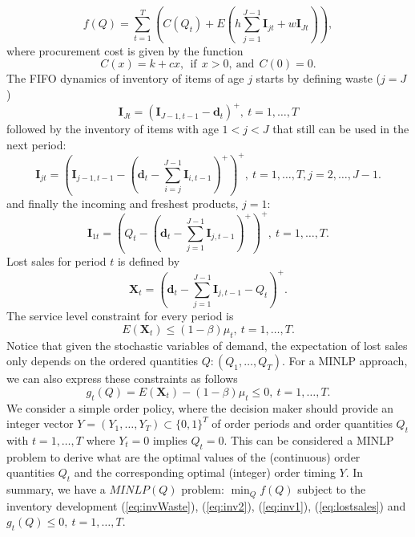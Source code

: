 \begin{equation}
\label{eq:obj}
f(Q)=\sum_{t=1}^T \left(C(Q_t) + E\left(h\sum_{j=1}^{J-1} \boldsymbol{I}_{jt}  +w\boldsymbol{I}_{Jt}\right)\right),
\end{equation}
where procurement cost is given by the function
\begin{equation}
\label{eq:proc}
C(x) = k+cx, \ \ \text{if} \ \ x>0,\ \text{and}\ \ C(0)=0 .
\end{equation}
%
The FIFO dynamics of inventory of items of  age $j$ starts by defining waste ($j=J$)
\begin{equation}
\label{eq:invWaste}
\boldsymbol{I}_{Jt}=(\boldsymbol{I}_{J-1,t-1} - \boldsymbol{d}_t)^+, \ t=1,\ldots,T
\end{equation}
followed by the inventory of items with age $1<j<J$ that still can be used in the next period:
\begin{equation}
\label{eq:inv2}
\boldsymbol{I}_{jt}= \left(\boldsymbol{I}_{j-1,t-1} - (\boldsymbol{d}_t-\sum_{i=j}^{J-1}\boldsymbol{I}_{i,t-1})^+\right)^+, \ t=1,\ldots,T, j=2,\ldots,J-1 .
\end{equation}
%
and finally the incoming and freshest products, $j=1$:
%
\begin{equation}
\label{eq:inv1}
\boldsymbol{I}_{1t}= \left(Q_t - (\boldsymbol{d}_t-\sum_{j=1}^{J-1}\boldsymbol{I}_{j,t-1})^+\right)^+, \ t=1,\ldots,T.
\end{equation}
%
Lost sales for period $t$ is defined by
%
\begin{equation}
\label{eq:lostsales}
\boldsymbol{X}_t=\left(\boldsymbol{d}_t-\sum_{j=1}^{J-1}\boldsymbol{I}_{j,t-1}-Q_t\right)^+.
\end{equation}
%
The service level constraint for every period is
\begin{equation}
\label{eq:chance}
E \left(\boldsymbol{X}_t\right) \le (1-\beta) \mu_t, \ t=1,\ldots,T.
\end{equation}
%
Notice that given the stochastic variables of demand, the expectation of lost sales only depends on the ordered quantities $Q: (Q_1,\ldots, Q_T)$. For a MINLP approach, we can also express these constraints as follows
%
\begin{equation}
\label{eq:defg}
g_t(Q)=E \left(\boldsymbol{X}_t\right) - (1-\beta)\mu_t\le 0,\ t=1,\ldots,T.
\end{equation}
%
We consider a simple order policy, where the decision maker should provide an integer vector $Y=(Y_1,\ldots,Y_T)\subset \{0,1\}^T$ of order periods and order quantities $Q_t$ with $t=1,\ldots,T$ where $Y_t=0$ implies $Q_t=0$. This can be considered a MINLP problem to derive what are the optimal values of the (continuous) order quantities $Q_t$ and the corresponding optimal (integer) order timing $Y$. In summary, we have a $MINLP (Q)$ problem:
$\min_Q f(Q)$
subject to the inventory development (\ref{eq:invWaste}), (\ref{eq:inv2}), (\ref{eq:inv1}), (\ref{eq:lostsales}) and $g_t(Q)\le 0,\ t=1,\ldots,T$.




